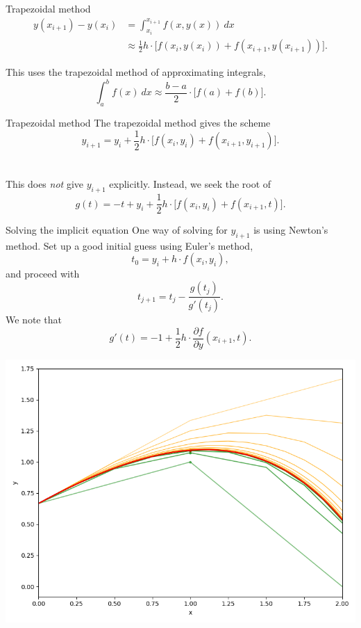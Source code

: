 \documentclass{beamer}
\begin{document}
    \begin{frame}{Trapezoidal method}
        \begin{align*}
            y(x_{i + 1}) - y(x_i) &= \int_{x_i}^{x_{i + 1}} f(x, y(x))\:dx \\
            &\approx \frac{1}{2}h\cdot\Big[f(x_i, y(x_i)) + f(x_{i + 1},
            y(x_{i + 1}))\Big].
        \end{align*}
        
        This uses the trapezoidal method of approximating integrals,
        \[
            \int_a^b f(x)\:dx \approx \frac{b - a}{2}\cdot\Big[f(a) + f(b)\Big].
        \] 
    \end{frame}

    \begin{frame}{Trapezoidal method}
        The trapezoidal method gives the scheme \[
            y_{i + 1} = y_i + \frac{1}{2}h\cdot \Big[f(x_i, y_i) + f(x_{i + 1},
            y_{i + 1})\Big].
        \] \\~\\

        This does \emph{not} give $y_{i + 1}$ explicitly. Instead, we seek the root
        of \[
            g(t) = -t + y_i + \frac{1}{2}h\cdot \Big[f(x_i, y_i) + f(x_{i + 1},
            t)\Big].
        \] 
    \end{frame}

    \begin{frame}{Solving the implicit equation}
        One way of solving for $y_{i + 1}$ is using Newton's method. Set up a good
        initial guess using Euler's method, \[
            t_0 = y_i + h\cdot f(x_i, y_i),
        \] and proceed with \[
            t_{j + 1} = t_j - \frac{g(t_j)}{g'(t_j)}.
        \] We note that \[
            g'(t) = -1 + \frac{1}{2}h\cdot \frac{\partial f}{\partial y}(x_{i + 1},
            t).
        \] 
    \end{frame}
    
    \begin{frame}[plain]
        \begin{center}
            \includegraphics[width=\textwidth]{./img/trapezoidal.png}
        \end{center}
    \end{frame}
\end{document}
